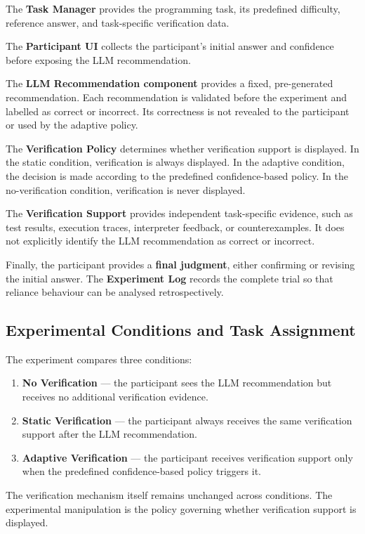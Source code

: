 \documentclass[oneside,final,14pt,a4paper]{extreport}
\theoremstyle{definition}
\theoremstyle{remark}
\begin{document}
The \textbf{Task Manager} provides the programming task, its predefined
difficulty, reference answer, and task-specific verification data.

The \textbf{Participant UI} collects the participant's initial answer and
confidence before exposing the LLM recommendation.

The \textbf{LLM Recommendation component} provides a fixed, pre-generated
recommendation. Each recommendation is validated before the experiment and
labelled as correct or incorrect. Its correctness is not revealed to the
participant or used by the adaptive policy.

The \textbf{Verification Policy} determines whether verification support is
displayed. In the static condition, verification is always displayed. In the
adaptive condition, the decision is made according to the predefined
confidence-based policy. In the no-verification condition, verification is
never displayed.

The \textbf{Verification Support} provides independent task-specific evidence,
such as test results, execution traces, interpreter feedback, or
counterexamples. It does not explicitly identify the LLM recommendation as
correct or incorrect.

Finally, the participant provides a \textbf{final judgment}, either confirming
or revising the initial answer. The \textbf{Experiment Log} records the
complete trial so that reliance behaviour can be analysed retrospectively.

\subsection{Experimental Conditions and Task Assignment}
The experiment compares three conditions:
\begin{enumerate}
    \item \textbf{No Verification} --- the participant sees the LLM
    recommendation but receives no additional verification evidence.
    \item \textbf{Static Verification} --- the participant always receives the
    same verification support after the LLM recommendation.
    \item \textbf{Adaptive Verification} --- the participant receives
    verification support only when the predefined confidence-based policy
    triggers it.
\end{enumerate}

The verification mechanism itself remains unchanged across conditions. The
experimental manipulation is the policy governing whether verification support
is displayed.
\end{document}
